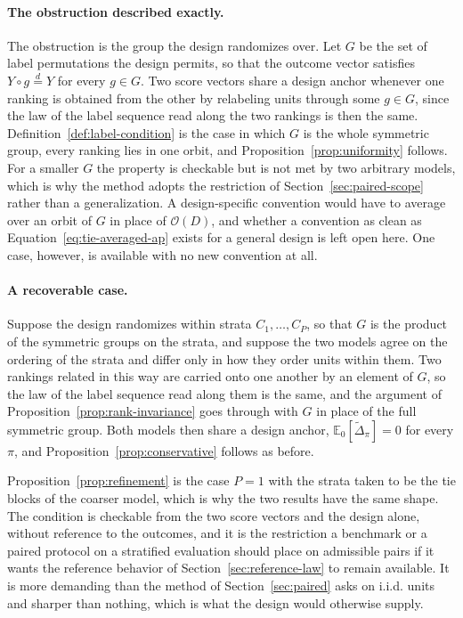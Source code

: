 \documentclass[11pt]{article}
\newcommand{\E}{\mathbb{E}}
\newcommand{\Dta}{\widetilde{\Delta}}
\theoremstyle{remark}
\begin{document}
\paragraph{The obstruction described exactly.}
The obstruction is the group the design randomizes over. Let $G$ be the set of label permutations the design permits, so that the outcome vector satisfies $Y\circ g\overset{d}{=}Y$ for every $g\in G$. Two score vectors share a design anchor whenever one ranking is obtained from the other by relabeling units through some $g\in G$, since the law of the label sequence read along the two rankings is then the same. Definition~\ref{def:label-condition} is the case in which $G$ is the whole symmetric group, every ranking lies in one orbit, and Proposition~\ref{prop:uniformity} follows. For a smaller $G$ the property is checkable but is not met by two arbitrary models, which is why the method adopts the restriction of Section~\ref{sec:paired-scope} rather than a generalization. A design-specific convention would have to average over an orbit of $G$ in place of $\mathcal{O}(D)$, and whether a convention as clean as Equation~\eqref{eq:tie-averaged-ap} exists for a general design is left open here. One case, however, is available with no new convention at all.

\paragraph{A recoverable case.}
Suppose the design randomizes within strata $C_1,\ldots,C_P$, so that $G$ is the product of the symmetric groups on the strata, and suppose the two models agree on the ordering of the strata and differ only in how they order units within them. Two rankings related in this way are carried onto one another by an element of $G$, so the law of the label sequence read along them is the same, and the argument of Proposition~\ref{prop:rank-invariance} goes through with $G$ in place of the full symmetric group. Both models then share a design anchor, $\E_0[\Dta_\pi]=0$ for every $\pi$, and Proposition~\ref{prop:conservative} follows as before.

Proposition~\ref{prop:refinement} is the case $P=1$ with the strata taken to be the tie blocks of the coarser model, which is why the two results have the same shape. The condition is checkable from the two score vectors and the design alone, without reference to the outcomes, and it is the restriction a benchmark or a paired protocol on a stratified evaluation should place on admissible pairs if it wants the reference behavior of Section~\ref{sec:reference-law} to remain available. It is more demanding than the method of Section~\ref{sec:paired} asks on i.i.d. units and sharper than nothing, which is what the design would otherwise supply.
\end{document}
